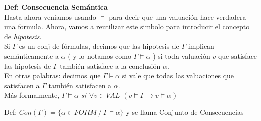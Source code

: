 \documentclass[14pt,a4paper,fleqn]{article}
\newcommand{\entonces}{\rightarrow}
\newcommand{\satisface}{\vDash}
\newcommand{\conSeman}{\vDash}
\begin{document}
\textbf{Def: Consecuencia Semántica} \\
Hasta ahora veniamos usando $\satisface$ para decir que una valuación hace verdadera una formula. Ahora, vamos a reutilizar este simbolo para introducir el concepto de \emph{hipotesis}.\\
Si $\Gamma$ es un conj de fórmulas, decimos que las hipotesis de $\Gamma$ implican semánticamente a $\alpha$ ( y lo notamos como $\Gamma \conSeman \alpha$ ) si toda valuación $v$ que satisface las hipotesis de $\Gamma$ también satisface a la conclusión $\alpha$. \\
En otras palabras: decimos que $\Gamma \conSeman \alpha$ si vale que todas las valuaciones que satisfacen a $\Gamma$ también satisfacen a $\alpha$.\\
Más formalmente, \emph{$\Gamma \conSeman \alpha$ si $\forall v \in VAL$ $(v \satisface \Gamma \entonces v \satisface \alpha)$}

Def: $Con(\Gamma) = \{ \alpha \in FORM \: / \: \Gamma \conSeman \alpha \}$ y se llama Conjunto de Consecuencias 
\end{document}
